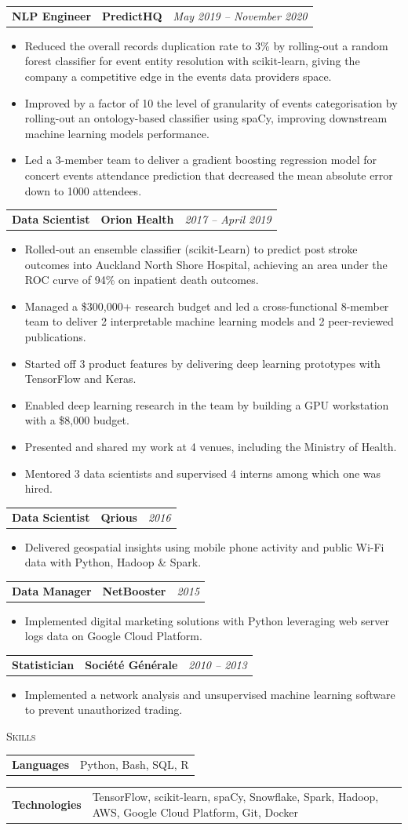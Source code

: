 \documentclass[letterpaper,11pt]{article}
\renewcommand{\section}[1]{
  {\scshape\color{blue}#1}{\color{blue}\hrulefill}{\vspace{0.2cm}}
}
\newcommand{\resumeItem}[1]{
  \item\small{#1 \vspace{-6pt}}
}
\newcommand{\resumeItemListStart}{\begin{itemize}[label=$\circ$, topsep=0.2cm, leftmargin=0.4cm]}
\newcommand{\resumeItemListEnd}{\end{itemize}\vspace{8pt}}
\newcommand{\job}[4]{
    \begin{tabular}{p{7cm}p{6cm}p{5cm}}
      \hspace{-0.7em} \textbf{#1} & \textbf{\small{#2}} & \hfill \textit{\small{#4}}
    \end{tabular}
}
\newcommand{\skillGroup}[2]{
    \begin{tabular}{p{7cm}p{11cm}}
      \hspace{-0.7em} \textbf{\small{#1}} & \small{#2}
    \end{tabular}
}
\begin{document}
\job {NLP Engineer}{PredictHQ}{Auckland}{May 2019 -- November 2020}
\resumeItemListStart
\resumeItem {Reduced the overall records duplication rate to 3\% by rolling-out a random forest classifier for event entity resolution with scikit-learn, giving the company a competitive edge in the events data providers space.}
\resumeItem {Improved by a factor of 10 the level of granularity of events categorisation by rolling-out an ontology-based classifier using spaCy, improving downstream machine learning models performance.}
\resumeItem {Led a 3-member team to deliver a gradient boosting regression model for concert events attendance prediction that decreased the mean absolute error down to 1000 attendees.}
\resumeItemListEnd	
	
\job {Data Scientist}{Orion Health}{Auckland}{2017 -- April 2019}
\resumeItemListStart
\resumeItem {Rolled-out an ensemble classifier (scikit-Learn) to predict post stroke outcomes into Auckland North Shore Hospital, achieving an area under the ROC curve of 94\% on inpatient death outcomes.}
\resumeItem {Managed a \$300,000+ research budget and led a cross-functional 8-member team to deliver 2 interpretable machine learning models and 2 peer-reviewed publications.}
\resumeItem {Started off 3 product features by delivering deep learning prototypes with TensorFlow and Keras.}
\resumeItem {Enabled deep learning research in the team by building a GPU workstation with a \$8,000 budget.}
\resumeItem {Presented and shared my work at 4 venues, including the Ministry of Health.}
\resumeItem {Mentored 3 data scientists and supervised 4 interns among which one was hired.}
\resumeItemListEnd

\job {Data Scientist}{Qrious}{Auckland}{2016}
\resumeItemListStart
\resumeItem {Delivered geospatial insights using mobile phone activity and public Wi-Fi data with Python, Hadoop \& Spark.}
\resumeItemListEnd

\job {Data Manager}{NetBooster}{Paris}{2015}
\resumeItemListStart
\resumeItem {Implemented digital marketing solutions with Python leveraging web server logs data on Google Cloud Platform.}
\resumeItemListEnd

\job {Statistician}{Société Générale}{Paris}{2010 -- 2013}
\resumeItemListStart
\resumeItem {Implemented a network analysis and unsupervised machine learning software to prevent unauthorized trading.}
\resumeItemListEnd


\section{Skills}
\skillGroup {Languages}{Python, Bash, SQL, R}
\skillGroup {Technologies}{TensorFlow, scikit-learn, spaCy, Snowflake, Spark, Hadoop, AWS, Google Cloud Platform, Git, Docker}
   
\end{document}
